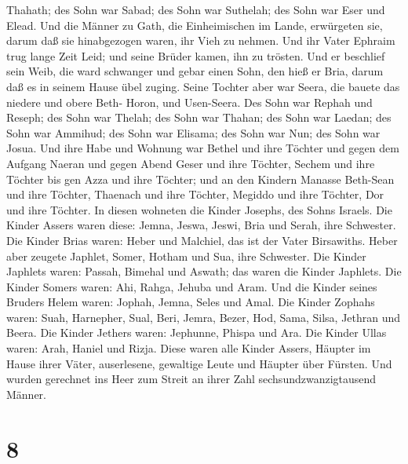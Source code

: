 Thahath;  des Sohn war Sabad; des Sohn war Suthelah; des
Sohn war Eser und Elead. Und die Männer zu Gath, die Einheimischen im
Lande, erwürgeten sie, darum daß sie hinabgezogen waren, ihr Vieh zu
nehmen.  Und ihr Vater Ephraim trug lange Zeit Leid; und
seine Brüder kamen, ihn zu trösten.  Und er beschlief sein
Weib, die ward schwanger und gebar einen Sohn, den hieß er Bria, darum
daß es in seinem Hause übel zuging.  Seine Tochter aber war
Seera, die bauete das niedere und obere Beth- Horon, und Usen-Seera.
 Des Sohn war Rephah und Reseph; des Sohn war Thelah; des
Sohn war Thahan;  des Sohn war Laedan; des Sohn war
Ammihud; des Sohn war Elisama;  des Sohn war Nun; des Sohn
war Josua.  Und ihre Habe und Wohnung war Bethel und ihre
Töchter und gegen dem Aufgang Naeran und gegen Abend Geser und ihre
Töchter, Sechem und ihre Töchter bis gen Azza und ihre Töchter;
 und an den Kindern Manasse Beth-Sean und ihre Töchter,
Thaenach und ihre Töchter, Megiddo und ihre Töchter, Dor und ihre
Töchter. In diesen wohneten die Kinder Josephs, des Sohns Israels.
 Die Kinder Assers waren diese: Jemna, Jeswa, Jeswi, Bria
und Serah, ihre Schwester.  Die Kinder Brias waren: Heber
und Malchiel, das ist der Vater Birsawiths.  Heber aber
zeugete Japhlet, Somer, Hotham und Sua, ihre Schwester. 
Die Kinder Japhlets waren: Passah, Bimehal und Aswath; das waren die
Kinder Japhlets.  Die Kinder Somers waren: Ahi, Rahga,
Jehuba und Aram.  Und die Kinder seines Bruders Helem
waren: Jophah, Jemna, Seles und Amal.  Die Kinder Zophahs
waren: Suah, Harnepher, Sual, Beri, Jemra,  Bezer, Hod,
Sama, Silsa, Jethran und Beera.  Die Kinder Jethers waren:
Jephunne, Phispa und Ara.  Die Kinder Ullas waren: Arah,
Haniel und Rizja.  Diese waren alle Kinder Assers, Häupter
im Hause ihrer Väter, auserlesene, gewaltige Leute und Häupter über
Fürsten. Und wurden gerechnet ins Heer zum Streit an ihrer Zahl
sechsundzwanzigtausend Männer.

\hypertarget{section-7}{%
\section{8}\label{section-7}}

